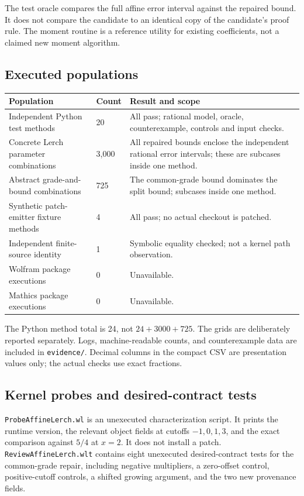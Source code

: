 \documentclass[11pt,letterpaper]{article}
\newcommand{\code}[1]{\nolinkurl{#1}}
\begin{document}
The test oracle compares the full affine error interval against the repaired
bound. It does not compare the candidate to an identical copy of the
candidate's proof rule. The moment routine is a reference utility for existing
coefficients, not a claimed new moment algorithm.

\subsection{Executed populations}
\begin{longtable}{@{}P{0.45\textwidth}P{0.14\textwidth}P{0.34\textwidth}@{}}
\toprule Population & Count & Result and scope\\\midrule\endhead
Independent Python test methods & 20 & All pass; rational model, oracle, counterexample, controls and input checks.\\
Concrete Lerch parameter combinations & 3,000 & All repaired bounds enclose the independent rational error intervals; these are subcases inside one method.\\
Abstract grade-and-bound combinations & 725 & The common-grade bound dominates the split bound; subcases inside one method.\\
Synthetic patch-emitter fixture methods & 4 & All pass; no actual checkout is patched.\\
Independent finite-source identity & 1 & Symbolic equality checked; not a kernel path observation.\\
Wolfram package executions & 0 & Unavailable.\\
Mathics package executions & 0 & Unavailable.\\
\bottomrule
\end{longtable}
The Python method total is 24, not $24+3000+725$. The grids are deliberately
reported separately. Logs, machine-readable counts, and counterexample data
are included in \code{evidence/}. Decimal columns in the compact CSV are
presentation values only; the actual checks use exact fractions.

\subsection{Kernel probes and desired-contract tests}
\code{ProbeAffineLerch.wl} is an unexecuted characterization script. It prints
the runtime version, the relevant object fields at cutoffs $-1,0,1,3$, and the
exact comparison against $5/4$ at $x=2$. It does not install a patch.
\code{ReviewAffineLerch.wlt} contains eight unexecuted desired-contract tests
for the common-grade repair, including negative multipliers, a zero-offset
control, positive-cutoff controls, a shifted growing argument, and the two
new provenance fields.
\end{document}
